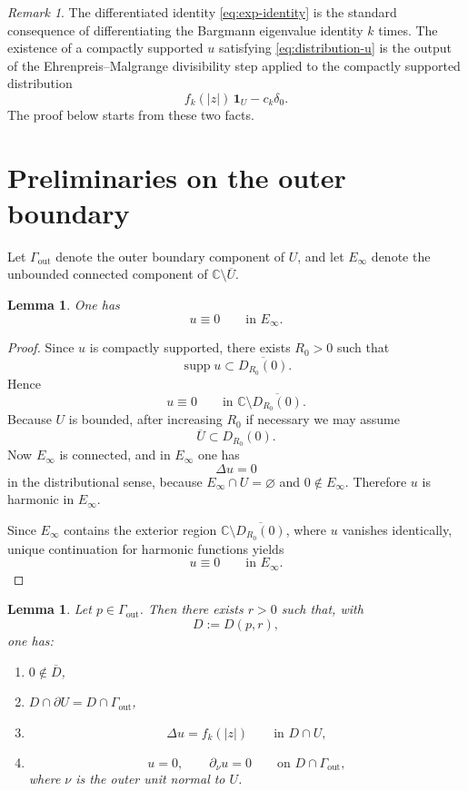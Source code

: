 \documentclass[11pt]{amsart}
\newtheorem{lemma}[theorem]{Lemma}
\theoremstyle{remark}
\newtheorem{remark}[theorem]{Remark}
\newcommand{\C}{\mathbb C}
\newcommand{\supp}{\operatorname{supp}}
\newcommand{\1}{\mathbf 1}
\begin{document}
\begin{remark}
The differentiated identity \eqref{eq:exp-identity} is the standard consequence of differentiating the Bargmann eigenvalue identity $k$ times. The existence of a compactly supported $u$ satisfying \eqref{eq:distribution-u} is the output of the Ehrenpreis--Malgrange divisibility step applied to the compactly supported distribution
\[
f_k(|z|)\,\1_U-c_k\delta_0.
\]
The proof below starts from these two facts.
\end{remark}

\section{Preliminaries on the outer boundary}

Let $\Gamma_{\mathrm{out}}$ denote the outer boundary component of $U$, and let $E_\infty$ denote the unbounded connected component of $\C\setminus \overline U$.

\begin{lemma}\label{lem:outer-zero}
One has
\[
u\equiv 0
\qquad\text{in }E_\infty.
\]
\end{lemma}

\begin{proof}
Since $u$ is compactly supported, there exists $R_0>0$ such that
\[
\supp u \subset \overline{D_{R_0}(0)}.
\]
Hence
\[
u\equiv 0
\qquad\text{in }\C\setminus \overline{D_{R_0}(0)}.
\]
Because $U$ is bounded, after increasing $R_0$ if necessary we may assume
\[
\overline U \subset D_{R_0}(0).
\]
Now $E_\infty$ is connected, and in $E_\infty$ one has
\[
\Delta u=0
\]
in the distributional sense, because $E_\infty\cap U=\varnothing$ and $0\notin E_\infty$. Therefore $u$ is harmonic in $E_\infty$.

Since $E_\infty$ contains the exterior region $\C\setminus \overline{D_{R_0}(0)}$, where $u$ vanishes identically, unique continuation for harmonic functions yields
\[
u\equiv 0
\qquad\text{in }E_\infty.
\]
\end{proof}

\begin{lemma}\label{lem:local-one-phase}
Let $p\in \Gamma_{\mathrm{out}}$. Then there exists $r>0$ such that, with
\[
D:=D(p,r),
\]
one has:
\begin{enumerate}[label=\textnormal{(\roman*)}]
\item $0\notin \overline D$,
\item $D\cap \partial U = D\cap \Gamma_{\mathrm{out}}$,
\item
\[
\Delta u = f_k(|z|)
\qquad\text{in }D\cap U,
\]
\item
\[
u=0,\qquad \partial_\nu u=0
\qquad\text{on }D\cap \Gamma_{\mathrm{out}},
\]
where $\nu$ is the outer unit normal to $U$.
\end{enumerate}
\end{lemma}
\end{document}
